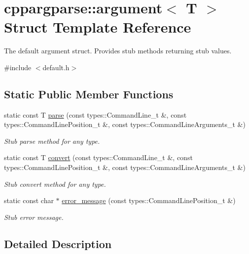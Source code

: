 \hypertarget{structcppargparse_1_1argument}{}\section{cppargparse\+:\+:argument$<$ T $>$ Struct Template Reference}
\label{structcppargparse_1_1argument}


The default argument struct. Provides stub methods returning stub values.  




{\ttfamily \#include $<$default.\+h$>$}

\subsection*{Static Public Member Functions}
\begin{DoxyCompactItemize}
\item 
static const T \hyperlink{structcppargparse_1_1argument_a9b5feac6fe8cf18beb63d85c0840cd84}{parse} (const types\+::\+Command\+Line\+\_\+t \&, const types\+::\+Command\+Line\+Position\+\_\+t \&, const types\+::\+Command\+Line\+Arguments\+\_\+t \&)
\begin{DoxyCompactList}\small\item\em Stub parse method for any type. \end{DoxyCompactList}\item 
static const T \hyperlink{structcppargparse_1_1argument_a2051f71ef4ed0b9d299cc58bb494e42b}{convert} (const types\+::\+Command\+Line\+\_\+t \&, const types\+::\+Command\+Line\+Position\+\_\+t \&, const types\+::\+Command\+Line\+Arguments\+\_\+t \&)
\begin{DoxyCompactList}\small\item\em Stub convert method for any type. \end{DoxyCompactList}\item 
static const char $\ast$ \hyperlink{structcppargparse_1_1argument_a40c742ace10b7eeb56f2e49429f9be33}{error\+\_\+message} (const types\+::\+Command\+Line\+Position\+\_\+t \&)
\begin{DoxyCompactList}\small\item\em Stub error message. \end{DoxyCompactList}\end{DoxyCompactItemize}


\subsection{Detailed Description}
